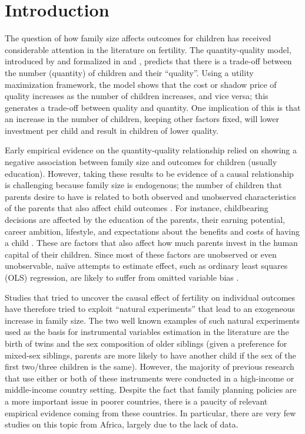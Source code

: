 
\section{Introduction}

The question of how family size affects outcomes for children has received considerable attention in the literature on fertility. The quantity-quality model, introduced by \textcite{Becker1960} and formalized in \textcite{Becker1973} and \textcite{Becker1976}, predicts that there is a trade-off between the number (quantity) of children and their “quality”. Using a utility maximization framework, the model shows that the cost or shadow price of quality increases as the number of children increases, and vice versa; this generates a trade-off between quality and quantity. One implication of this is that an increase in the number of children, keeping other factors fixed, will lower investment per child and result in children of lower quality.

Early empirical evidence on the quantity-quality relationship relied on showing a negative association between family size and outcomes for children (usually education).  However, taking these results to be evidence of a causal relationship is challenging because family size is endogenous; the number of children that parents desire to have is related to both observed and unobserved characteristics of the parents that also affect child outcomes \parencite{Black2010}. For instance, childbearing decisions are affected by the education of the parents, their earning potential, career ambition, lifestyle, and expectations about the benefits and costs of having a child \parencite{Angrist2006,oberg_casual_2021}. These are factors that also affect how much parents invest in the human capital of their children. Since most of these factors are unobserved or even unobservable, naïve attempts to estimate effect, such as ordinary least squares (OLS) regression, are likely to suffer from omitted variable bias \parencite{oberg_casual_2021}.

Studies that tried to uncover the causal effect of fertility on individual outcomes have therefore tried to exploit “natural experiments” that lead to an exogeneous increase in family size. The two well known examples of such natural experiments used as the basis for instrumental variables estimation in the literature are the birth of twins and the sex composition of older siblings (given a preference for mixed-sex siblings, parents are more likely to have another child if the sex of the first two/three children is the same). However, the majority of previous research that use either or both of these instruments were conducted in a high-income or middle-income country setting. Despite the fact that family planning policies are a more important issue in poorer countries, there is a paucity of relevant empirical evidence coming from these countries. In particular, there are very few studies on this topic from Africa, largely due to the lack of data. 

